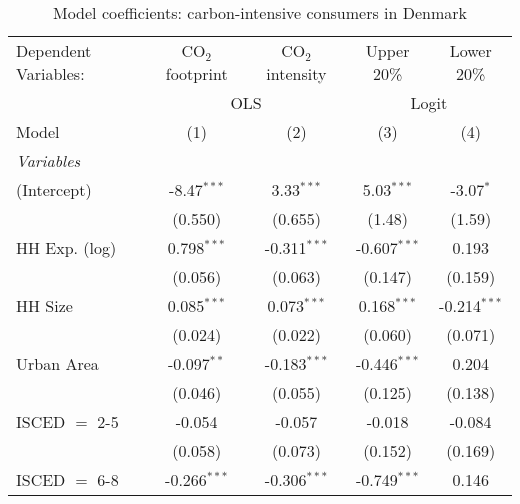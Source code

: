 
\begin{table}[htbp!]
   \centering
   \small
   \begin{adjustbox}{width = 1\textwidth, max height = 0.95\textheight, center}
      \begin{threeparttable}[b]
         \caption{\label{tab:Logit_1_DNK} Model coefficients: carbon-intensive consumers in Denmark}
         \begin{tabular}{lcccc}
            \tabularnewline \midrule \midrule
            Dependent Variables: & CO$_{2}$ footprint & CO$_{2}$ intensity & Upper 20\%     & Lower 20\%\\   
             & \multicolumn{2}{c}{OLS} & \multicolumn{2}{c}{Logit} \\ 
            Model                & (1)                & (2)                & (3)            & (4)\\  
            \midrule
            \emph{Variables}\\
            (Intercept)          & -8.47$^{***}$      & 3.33$^{***}$       & 5.03$^{***}$   & -3.07$^{*}$\\   
                                 & (0.550)            & (0.655)            & (1.48)         & (1.59)\\   
            HH Exp. (log)        & 0.798$^{***}$      & -0.311$^{***}$     & -0.607$^{***}$ & 0.193\\   
                                 & (0.056)            & (0.063)            & (0.147)        & (0.159)\\   
            HH Size              & 0.085$^{***}$      & 0.073$^{***}$      & 0.168$^{***}$  & -0.214$^{***}$\\   
                                 & (0.024)            & (0.022)            & (0.060)        & (0.071)\\   
            Urban Area           & -0.097$^{**}$      & -0.183$^{***}$     & -0.446$^{***}$ & 0.204\\   
                                 & (0.046)            & (0.055)            & (0.125)        & (0.138)\\   
            ISCED $=$ 2-5        & -0.054             & -0.057             & -0.018         & -0.084\\   
                                 & (0.058)            & (0.073)            & (0.152)        & (0.169)\\   
            ISCED $=$ 6-8        & -0.266$^{***}$     & -0.306$^{***}$     & -0.749$^{***}$ & 0.146\\   

\end{tabular}
\end{threeparttable}
\end{adjustbox}
\end{table}
